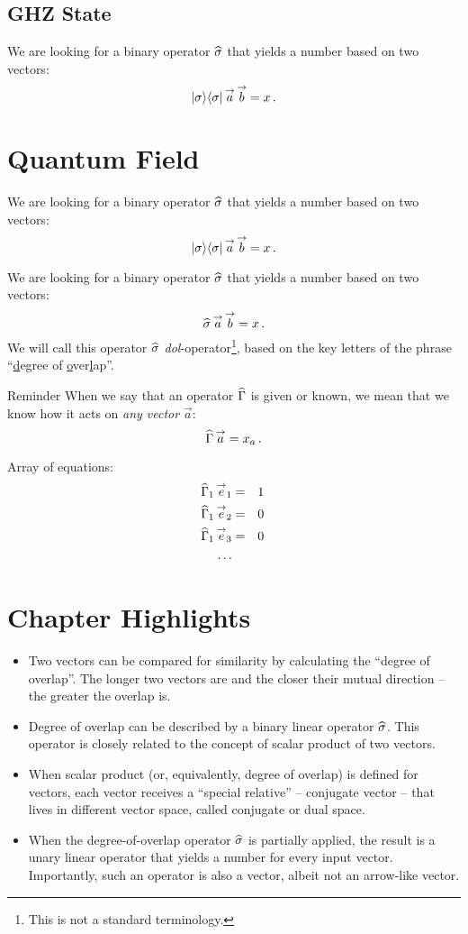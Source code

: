 \subsection{GHZ State}\label{sec:GHZState}
We are looking for a binary operator $\widehat{\sigma}$ that yields a number
based on two vectors:
\[
|{\sigma}\rangle\langle{\sigma}|\,\overset{\rightarrow}{a}\,\overset{\rightarrow}{b}=x\,.
\]


\section{Quantum Field}\label{sec:QuantumField}
We are looking for a binary operator $\widehat{\sigma}$ that yields a number
based on two vectors:
\[
|{\sigma}\rangle\langle{\sigma}|\,\overset{\rightarrow}{a}\,\overset{\rightarrow}{b}=x\,.
\]

We are looking for a binary operator $\widehat{\sigma}$ that yields a number
based on two vectors:
\[
\widehat{\sigma}\,\overset{\rightarrow}{a}\,\overset{\rightarrow}{b}=x\,.
\]
We will call this operator $\widehat{\sigma}$ \emph{dol}-operator\footnote{This is not a
standard terminology. }, based on the key letters of the phrase
``\underline{d}egree of \underline{o}ver\underline{l}ap''.

\begin{myrem}{Reminder}
When we say that an operator $\widehat{\Gamma}$ is given or known, we
mean that we know how it acts on \emph{any vector} $\vec{a}$:
\[
\widehat{\Gamma}\,\overset{\rightarrow}{a} = x_a\,.
\]
\end{myrem}

Array of equations:
\begin{eqnarray}
  \widehat{\Gamma}_1\,\overset{\rightarrow}{e}_1 & = & 1\,\\
  \widehat{\Gamma}_1\,\overset{\rightarrow}{e}_2 & = & 0\,\\
  \widehat{\Gamma}_1\,\overset{\rightarrow}{e}_3 & = & 0\,\\
  \ldots
\end{eqnarray}

\section*{Chapter Highlights}
{\chhc
  \it
\begin{itemize}
\item Two vectors can be compared for similarity by calculating the
  ``degree of overlap''. The longer two vectors are and the closer
  their mutual direction -- the greater the overlap is.
\item Degree of overlap can be described by a binary linear operator
  $\widehat{\sigma}$. This operator is closely related to the concept of
  scalar product of two vectors.
\item When scalar product (or, equivalently, degree of overlap) is
  defined for vectors, each vector receives a ``special relative'' --
  conjugate vector -- that lives in different vector space, called
  conjugate or dual space.
\item When the degree-of-overlap operator $\widehat{\sigma}$ is partially
  applied, the result is a unary linear operator that yields a number
  for every input vector. Importantly, such an operator is also a
  vector, albeit not an arrow-like vector.
\end{itemize}

}
